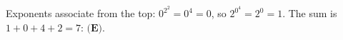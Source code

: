 Exponents associate from the top: $0^{2^2}=0^4=0$, so $2^{0^{4}}=2^0=1$. The sum is $1+0+4+2=7$: $\boxed{\textbf{(E)}}$.
